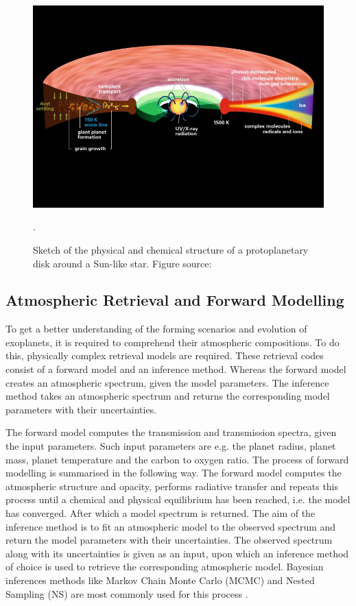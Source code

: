 \begin{figure} [!htb]
    \centering
    \includegraphics[scale=0.5]{figuren/protodisk.png}
    \caption{Sketch of the physical and chemical structure of a protoplanetary disk around a Sun-like star\cite{henning2013chemistry}. Figure source: \cite{henning2013chemistry}}.
    \label{fig:protodisk}
\end{figure}


\subsection{Atmospheric Retrieval and Forward Modelling} \label{atm_retrieval}
To get a better understanding of the forming scenarios and evolution of exoplanets, it is required to comprehend their atmospheric compositions. To do this, physically complex retrieval models are required. These retrieval codes consist of a forward model and an inference method. Whereas the forward model creates an atmospheric spectrum, given the model parameters. The inference method takes an atmospheric spectrum and returns the corresponding model parameters with their uncertainties.

The forward model computes the transmission and transmission spectra, given the input parameters. Such input parameters are e.g. the planet radius, planet mass, planet temperature and the carbon to oxygen ratio. The process of forward modelling is summarised in the following way. The forward model computes the atmospheric structure and opacity, performs radiative transfer and repeats this process until a chemical and physical equilibrium has been reached, i.e. the model has converged. After which a model spectrum is returned. The aim of the inference method is to fit an atmospheric model to the observed spectrum and return the model parameters with their uncertainties. The observed spectrum along with its uncertainties is given as an input, upon which an inference method of choice is used to retrieve the corresponding atmospheric model. Bayesian inferences methods like Markov Chain Monte Carlo (MCMC) and Nested Sampling (NS) are most commonly used for this process \cite{madhusudhan2018atmospheric}. 

